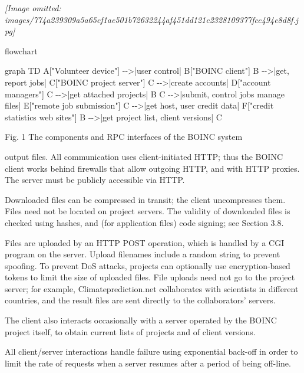 \documentclass[
]{article}
\newenvironment{Shaded}{}{}
\newcommand{\NormalTok}[1]{#1}
\begin{document}
\textit{[Image omitted: images/774a239309a5a65cf1ae501b72632244af451dd121c2328109377fcc494e8d8f.jpg]}

flowchart

\begin{Shaded}
\begin{Highlighting}[]
\NormalTok{graph TD}
\NormalTok{    A["Volunteer device"] {-}{-}\textgreater{}|user control| B["BOINC client"]}
\NormalTok{    B {-}{-}\textgreater{}|get, report jobs| C["BOINC project server"]}
\NormalTok{    C {-}{-}\textgreater{}|create accounts| D["account managers"]}
\NormalTok{    C {-}{-}\textgreater{}|get attached projects| B}
\NormalTok{    C {-}{-}\textgreater{}|submit, control jobs manage files| E["remote job submission"]}
\NormalTok{    C {-}{-}\textgreater{}|get host, user credit data| F["credit statistics web sites"]}
\NormalTok{    B {-}{-}\textgreater{}|get project list, client versions| C}
\end{Highlighting}
\end{Shaded}

Fig. 1 The components and RPC interfaces of the BOINC system

output files. All communication uses client-initiated HTTP; thus the
BOINC client works behind firewalls that allow outgoing HTTP, and with
HTTP proxies. The server must be publicly accessible via HTTP.

Downloaded files can be compressed in transit; the client uncompresses
them. Files need not be located on project servers. The validity of
downloaded files is checked using hashes, and (for application files)
code signing; see Section 3.8.

Files are uploaded by an HTTP POST operation, which is handled by a CGI
program on the server. Upload filenames include a random string to
prevent spoofing. To prevent DoS attacks, projects can optionally use
encryption-based tokens to limit the size of uploaded files. File
uploads need not go to the project server; for example,
Climateprediction.net collaborates with scientists in different
countries, and the result files are sent directly to the collaborators'
servers.

The client also interacts occasionally with a server operated by the
BOINC project itself, to obtain current lists of projects and of client
versions.

All client/server interactions handle failure using exponential back-off
in order to limit the rate of requests when a server resumes after a
period of being off-line.
\end{document}
